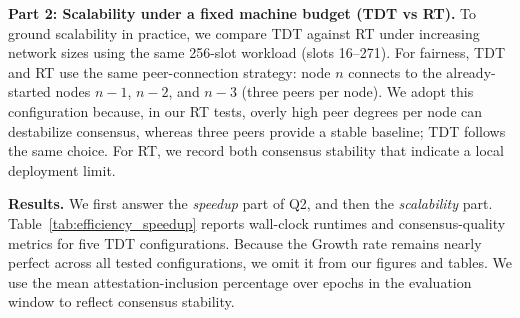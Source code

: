 \smallskip
\noindent\textbf{Part 2: Scalability under a fixed machine budget (TDT vs RT).}
To ground scalability in practice, we compare TDT against RT under increasing network sizes using the same 256-slot workload (slots 16--271).
For fairness, TDT and RT use the same peer-connection strategy: node $n$ connects to the already-started nodes $n\!-\!1$, $n\!-\!2$, and $n\!-\!3$ (three peers per node). We adopt this configuration because, in our RT tests, overly high peer degrees per node can destabilize consensus, whereas three peers provide a stable baseline; TDT follows the same choice.
For RT, we record both consensus stability that indicate a local deployment limit.




\smallskip
\noindent\textbf{Results.}
We first answer the \emph{speedup} part of Q2, and then the \emph{scalability} part.
Table~\ref{tab:efficiency_speedup} reports wall-clock runtimes and consensus-quality metrics for five TDT configurations.
Because the Growth rate remains nearly perfect across all tested configurations, we omit it from our figures and tables. We use the mean attestation-inclusion percentage over epochs in the evaluation window to reflect consensus stability.


